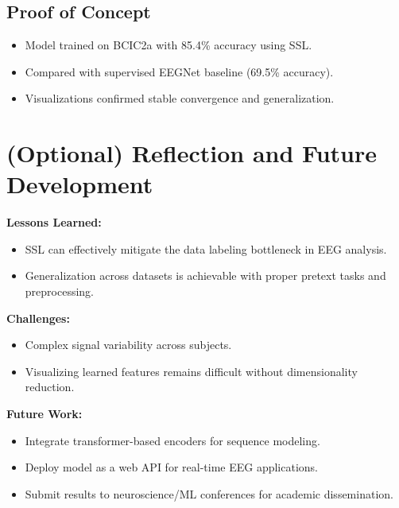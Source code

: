 \subsection{Proof of Concept}
\begin{itemize}
    \item Model trained on BCIC2a with 85.4\% accuracy using SSL.
    \item Compared with supervised EEGNet baseline (69.5\% accuracy).
    \item Visualizations confirmed stable convergence and generalization.
\end{itemize}

\section{(Optional) Reflection and Future Development}
\label{sec:reflection}

\textbf{Lessons Learned:}
\begin{itemize}
    \item SSL can effectively mitigate the data labeling bottleneck in EEG analysis.
    \item Generalization across datasets is achievable with proper pretext tasks and preprocessing.
\end{itemize}

\textbf{Challenges:}
\begin{itemize}
    \item Complex signal variability across subjects.
    \item Visualizing learned features remains difficult without dimensionality reduction.
\end{itemize}

\textbf{Future Work:}
\begin{itemize}
    \item Integrate transformer-based encoders for sequence modeling.
    \item Deploy model as a web API for real-time EEG applications.
    \item Submit results to neuroscience/ML conferences for academic dissemination.
\end{itemize}
